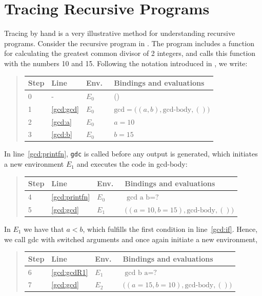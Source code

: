 \documentclass[fsharpNotes.tex]{subfiles}
\begin{document}
\section{Tracing Recursive Programs}
\label{sec:recursiveTracing}
Tracing by hand is a very illustrative method for understanding recursive programs. Consider the recursive program in .
%
%
The program includes a function for calculating the greatest common divisor of 2 integers, and calls this function with the numbers 10 and 15. Following the notation introduced in , we write:
\begin{quote}
  \begin{tabular*}{0.6\linewidth}{l|lll}
    Step & Line & Env.\ & Bindings and evaluations\\
    \hline
    0 & - & $E_0$ & ()\\
    1 &\ref{gcd:gcd} & $E_0$ & $\text{gcd} = \big((a, b), \text{gcd-body}, ()\big)$\\
    2 &\ref{gcd:a} & $E_0$ & $a = 10$\\
    3 &\ref{gcd:b} & $E_0$ & $b = 15$\\
  \end{tabular*}
\end{quote}
In line~\ref{gcd:printfn}, \lstinline!gdc! is called before any output is generated, which initiates a new environment $E_1$ and executes the code in gcd-body:
\begin{quote}
  \begin{tabular*}{0.6\linewidth}{l|lll}
    Step & Line & Env.\ & Bindings and evaluations\\
    \hline
  4 & \ref{gcd:printfn} & $E_0$ & $\text{gcd a b} = \text{?}$\\
  5 & \ref{gcd:gcd} & $E_1$ & $\big((a = 10, b =15), \text{gcd-body}, ()\big)$\\
  \end{tabular*}
\end{quote}
 In $E_1$ we have that $a<b$, which fulfills the first condition in line~\ref{gcd:if}. Hence, we call gdc with switched arguments and once again initiate a new environment,
\begin{quote}
  \begin{tabular*}{0.6\linewidth}{l|lll}
    Step & Line & Env.\ & Bindings and evaluations\\
    \hline
  6&\ref{gcd:gcdR1} & $E_1$ &$\text{gcd b a} = \text{?}$\\
  7 &\ref{gcd:gcd} & $E_2$ & $\big((a = 15, b = 10), \text{gcd-body}, ()\big)$\\
  \end{tabular*}
\end{quote}
\end{document}
